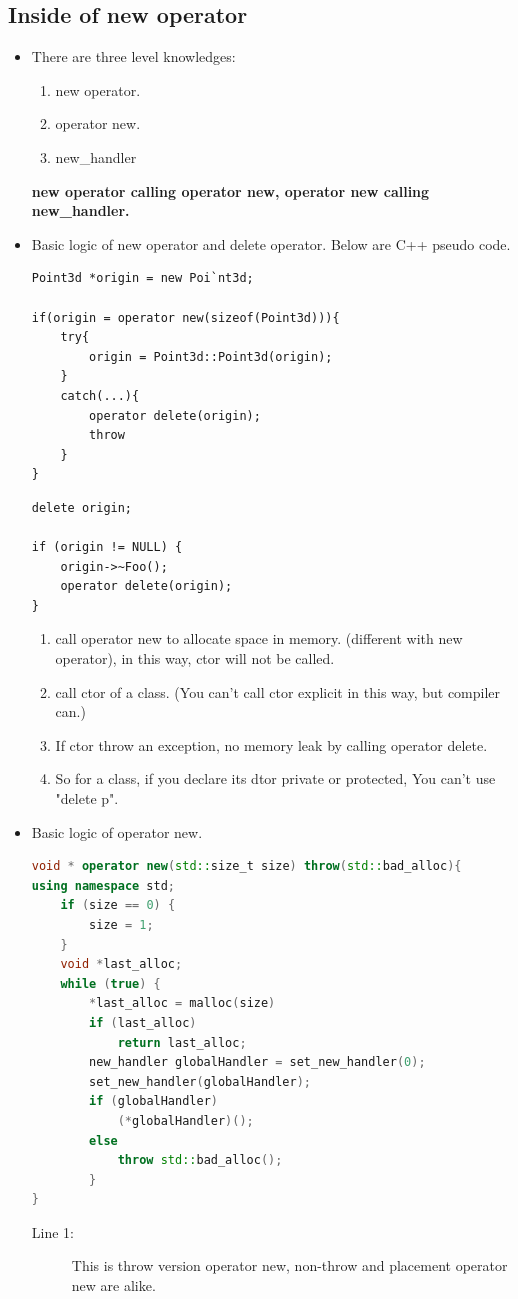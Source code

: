 \documentclass[a4paper,11pt,twoside]{book}
\begin{document}
\subsection{Inside of new operator}
\begin{itemize}
	\item There are three level knowledges: 
	\begin{enumerate}
		\item new operator.
		\item operator new.
		\item new\_handler
	\end{enumerate}
	\textbf{new operator calling operator new, operator new calling new\_handler.} 
	
	\item Basic logic of new operator and delete operator. Below are C++ pseudo code.
\begin{lstlisting}[numbers=none]
Point3d *origin = new Poi`nt3d;
	
if(origin = operator new(sizeof(Point3d))){
	try{
		origin = Point3d::Point3d(origin);
	}
	catch(...){
		operator delete(origin);
		throw
	}
}
\end{lstlisting}
	
\begin{lstlisting}[numbers=none]
delete origin;
	
if (origin != NULL) {
	origin->~Foo();
	operator delete(origin);
}
\end{lstlisting}
	
	\begin{enumerate}
		\item call operator new to allocate space in memory. (different with new operator), in this way, ctor will not be called.
		\item call ctor of a class. (You can't call ctor explicit in this way, but compiler can.)
		\item If ctor throw an exception, no memory leak by calling operator delete.
		
		\item So for a class, if you declare its dtor private or protected, You can't use "delete p".
	\end{enumerate}
	
	
\item Basic logic of operator new.
\begin{lstlisting}[frame=single, language=c++]
void * operator new(std::size_t size) throw(std::bad_alloc){
using namespace std; 
	if (size == 0) {   
		size = 1;             
	}                 
	void *last_alloc;
	while (true) {
		*last_alloc = malloc(size)
		if (last_alloc)
			return last_alloc;
		new_handler globalHandler = set_new_handler(0);
		set_new_handler(globalHandler);
		if (globalHandler) 
			(*globalHandler)();
		else 
			throw std::bad_alloc();
		}
}
	\end{lstlisting}
\begin{description}
	\item[Line 1:] This is throw version operator new, non-throw and placement operator new are alike. 
	

\end{description}
\end{itemize}
\end{document}
